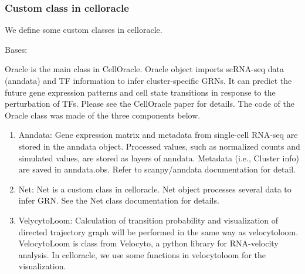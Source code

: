 \documentclass[letterpaper,10pt,english]{sphinxmanual}
\begin{document}
\subsubsection{Custom class in celloracle}
\label{\detokenize{modules/celloracle:custom-class-in-celloracle}}\label{\detokenize{modules/celloracle::doc}}
We define some custom classes in celloracle.

\label{\detokenize{modules/celloracle:module-celloracle}}

\begin{fulllineitems}
\label{\detokenize{modules/celloracle:celloracle.Oracle}}
Bases: 

Oracle is the main class in CellOracle. Oracle object imports scRNA-seq data (anndata) and TF information to infer cluster-specific GRNs. It can predict the future gene expression patterns and cell state transitions in response to  the perturbation of TFs. Please see the CellOracle paper for details.
The code of the Oracle class was made of the three components below.
\begin{enumerate}
\def\theenumi{\arabic{enumi}}
\def\labelenumi{(\theenumi )}
\makeatletter\def\p@enumii{\p@enumi (\theenumi )}\makeatother
\item {} 
Anndata: Gene expression matrix and metadata from single-cell RNA-seq are stored in the anndata object. Processed values, such as normalized counts and simulated values, are stored as layers of anndata. Metadata (i.e., Cluster info) are saved in anndata.obs. Refer to scanpy/anndata documentation for detail.

\item {} 
Net: Net is a custom class in celloracle. Net object processes several data to infer GRN. See the Net class documentation for details.

\item {} 
VelycytoLoom: Calculation of transition probability and visualization of directed trajectory graph will be performed in the same way as velocytoloom. VelocytoLoom is class from Velocyto, a python library for RNA-velocity analysis. In celloracle, we use some functions in velocytoloom for the visualization.


\end{enumerate}
\end{fulllineitems}
\end{document}
